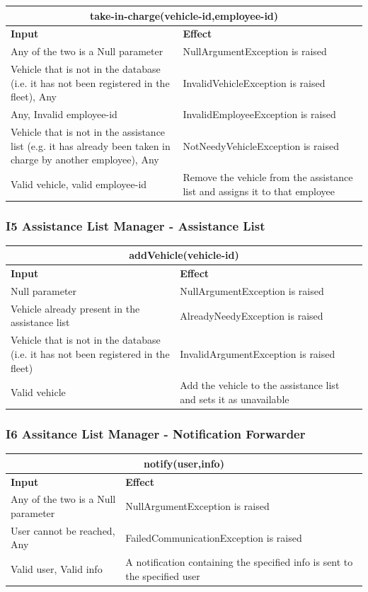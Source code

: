 \documentclass{article}
\begin{document}
\begin{tabular}{ |p{5cm}|p{7cm}| }
  \hline
  \multicolumn{2}{|c|}{take-in-charge(vehicle-id,employee-id)} \\
  \hline
  \textbf{Input} & \textbf{Effect} \\
  \hline
  Any of the two is a Null parameter & NullArgumentException is raised\\
  \hline
 Vehicle that is not in the database (i.e. it has not been registered in the fleet), Any & InvalidVehicleException is raised\\
  \hline
  Any, Invalid employee-id & InvalidEmployeeException is raised\\
  \hline
  Vehicle that is not in the assistance list (e.g. it has already been taken in charge by another employee), Any & NotNeedyVehicleException is raised\\
  \hline
  Valid vehicle, valid employee-id & Remove the vehicle from the assistance list and assigns it to that employee\\
  \hline
\end{tabular}
\subsubsection{I5 Assistance List Manager - Assistance List}
\begin{tabular}{ |p{5cm}|p{7cm}| }
  \hline
  \multicolumn{2}{|c|}{addVehicle(vehicle-id)} \\
  \hline
  \textbf{Input} & \textbf{Effect} \\
  \hline
  Null parameter & NullArgumentException is raised\\
  \hline
  Vehicle already present in the assistance list & AlreadyNeedyException is raised\\
  \hline
  Vehicle that is not in the database (i.e. it has not been registered in the fleet) & InvalidArgumentException is raised\\
  \hline
  Valid vehicle & Add the vehicle to the assistance list and sets it as unavailable\\
  \hline
\end{tabular}
\subsubsection{I6 Assitance List Manager - Notification Forwarder}
\begin{tabular}{ |p{5cm}|p{7cm}| }
  \hline
  \multicolumn{2}{|c|}{notify(user,info)} \\
  \hline
  \textbf{Input} & \textbf{Effect} \\
  \hline
   Any of the two is a Null parameter & NullArgumentException is raised\\
  \hline
 User cannot be reached, Any & FailedCommunicationException is raised\\
  \hline
  Valid user, Valid info & A notification containing the specified info is sent to the specified user\\
  \hline
\end{tabular}
\end{document}
